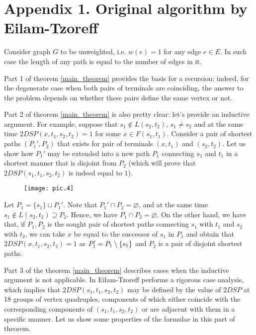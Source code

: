 \clearpage
\section{Appendix 1. Original algorithm by Eilam-Tzoreff}

Consider graph $G$ to be unweighted, i.e. $w(e) = 1$ for any edge $e \in E$. In such case the length of any path is equal to the number of edges in it.

Part 1 of theorem \ref{main_theorem} provides the basis for a recursion: indeed, for the degenerate case when both pairs of terminals are coinciding, the answer to the problem depends on whether these pairs define the same vertex or not.

Part 2 of theorem \ref{main_theorem} is also pretty clear: let's provide an inductive argument. For example, suppose that $s_1 \notin L(s_2, t_2)$, $s_1 \neq s_2$ and at the same time $2DSP(x, t_1, s_2, t_2) = 1$ for some $x \in F(s_1, t_1)$. Consider a pair of shortest paths $(P_1', P_2)$ that exists for pair of terminals $(x, t_1)$ and $(s_2, t_2)$. Let us show how $P_1'$ may be extended into a new path $P_1$ connecting $s_1$ and $t_1$ in a shortest manner that is disjoint from $P_2$ (which will prove that $2DSP(s_1, t_1, s_2, t_2)$ is indeed equal to $1$).

\begin{figure}[H]
\label{pic:ill2}
\centering
\texttt{[image: pic.4]}
\end{figure}

Let $P_1 = \{s_1\} \sqcup P_1'$. Note that $P_1' \cap P_2 = \varnothing$, and at the same time $s_1 \notin L(s_2, t_2) \supseteq P_2$. Hence, we have $P_1 \cap P_2 = \varnothing$. On the other hand, we have that, if $P_1, P_2$ is the sought pair of shortest paths connecting $s_1$ with $t_1$ and $s_2$ with $t_2$, we can take $x$ be equal to the successor of $s_1$ in $P_1$ and obtain that $2DSP(x, t_1, s_2, t_2) = 1$ as $P_1' = P_1 \setminus \{s_1\}$ and $P_2$ is a pair of disjoint shortest paths.

Part 3 of the theorem \ref{main_theorem} describes cases when the inductive argument is not applicable. In \cite{ET} Eilam-Tzoreff performs a rigorous case analysis, which implies that $2DSP(s_1, t_1, s_2, t_2)$  may be defined by the value of $2DSP$ at 18 groups of vertex quadruples, components of which either coincide with the corresponding components of $(s_1, t_1, s_2, t_2)$ or are adjacent with them in a specific manner. Let us show some properties of the formulae in this part of theorem.

